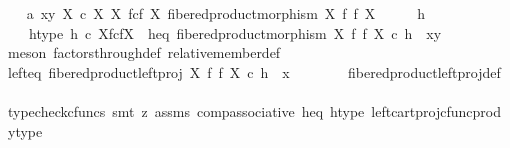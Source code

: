 \begin{isabellebody}
\ \ \isamarkupfalse%
\ a{}{\isacharcolon}{\kern0pt}\ {\isachardoublequoteopen}{\isasymlangle}x{\isacharcomma}{\kern0pt}y{\isasymrangle}\ {\isasymin}\isactrlbsub X\ {\isasymtimes}\isactrlsub c\ X\isactrlesub \ {\isacharparenleft}{\kern0pt}X\ \isactrlbsub f\isactrlesub {\isasymtimes}\isactrlsub c\isactrlbsub f\isactrlesub \ X{\isacharcomma}{\kern0pt}\ fibered{\isacharunderscore}{\kern0pt}product{\isacharunderscore}{\kern0pt}morphism\ X\ f\ f\ X{\isacharparenright}{\kern0pt}{\isachardoublequoteclose}\isanewline
\ \ \isamarkupfalse%
\ \isamarkupfalse%
\ h\ \isanewline
\ \ \ \ h{\isacharunderscore}{\kern0pt}type{\isacharcolon}{\kern0pt}\ {\isachardoublequoteopen}h\ {\isasymin}\isactrlsub c\ X\isactrlbsub f\isactrlesub {\isasymtimes}\isactrlsub c\isactrlbsub f\isactrlesub X{\isachardoublequoteclose}\ \ h{\isacharunderscore}{\kern0pt}eq{\isacharcolon}{\kern0pt}\ {\isachardoublequoteopen}fibered{\isacharunderscore}{\kern0pt}product{\isacharunderscore}{\kern0pt}morphism\ X\ f\ f\ X\ {\isasymcirc}\isactrlsub c\ h\ {\isacharequal}{\kern0pt}\ {\isasymlangle}x{\isacharcomma}{\kern0pt}y{\isasymrangle}{\isachardoublequoteclose}\isanewline
\ \ \ \ \isamarkupfalse%
\ {\isacharparenleft}{\kern0pt}meson\ factors{\isacharunderscore}{\kern0pt}through{\isacharunderscore}{\kern0pt}def{}\ relative{\isacharunderscore}{\kern0pt}member{\isacharunderscore}{\kern0pt}def{}{\isacharparenright}{\kern0pt}\isanewline
\isanewline
\ \ \isamarkupfalse%
\ left{\isacharunderscore}{\kern0pt}eq{\isacharcolon}{\kern0pt}\ {\isachardoublequoteopen}fibered{\isacharunderscore}{\kern0pt}product{\isacharunderscore}{\kern0pt}left{\isacharunderscore}{\kern0pt}proj\ X\ f\ f\ X\ {\isasymcirc}\isactrlsub c\ h\ {\isacharequal}{\kern0pt}\ x{\isachardoublequoteclose}\isanewline
\ \ \ \ \ \ \isamarkupfalse%
\ fibered{\isacharunderscore}{\kern0pt}product{\isacharunderscore}{\kern0pt}left{\isacharunderscore}{\kern0pt}proj{\isacharunderscore}{\kern0pt}def\isanewline
\ \ \ \ \ \ \isamarkupfalse%
\ {\isacharparenleft}{\kern0pt}typecheck{\isacharunderscore}{\kern0pt}cfuncs{\isacharcomma}{\kern0pt}\ smt\ {\isacharparenleft}{\kern0pt}z{}{\isacharparenright}{\kern0pt}\ assms{\isacharparenleft}{\kern0pt}{}{\isacharparenright}{\kern0pt}\ comp{\isacharunderscore}{\kern0pt}associative{}\ h{\isacharunderscore}{\kern0pt}eq\ h{\isacharunderscore}{\kern0pt}type\ left{\isacharunderscore}{\kern0pt}cart{\isacharunderscore}{\kern0pt}proj{\isacharunderscore}{\kern0pt}cfunc{\isacharunderscore}{\kern0pt}prod\ y{\isacharunderscore}{\kern0pt}type{\isacharparenright}{\kern0pt}\isanewline

\end{isabellebody}
